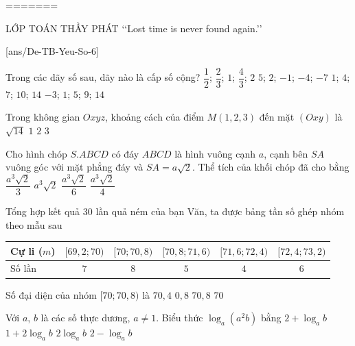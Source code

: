 =======
\begin{name}
	{\tenchude}
	{\tendethi}
	{LỚP TOÁN THẦY PHÁT}
	{\lq\lq Lost time is never found again.\rq\rq}
\end{name}

[ans/De-TB-Yeu-So-6]
\TN
\begin{ex}%
	Trong các dãy số sau, dãy nào là cấp số cộng?
	\choice
	{$\dfrac{1}{2}$; $\dfrac{2}{3}$; $1$; $\dfrac{4}{3}$; $2$}
	{\True $5$; $2$; $-1$; $-4$; $-7$}
	{$1$; $4$; $7$; $10$; $14$}
	{$-3$; $1$; $5$; $9$; $14$}
\end{ex}

\begin{ex}%
	Trong không gian $Oxyz$, khoảng cách của điểm $M(1,2,3)$ đến mặt $(Oxy)$ là
	\choice
	{$\sqrt{14}$}
	{$1$}
	{$2$}
	{\True $3$}
\end{ex}

\begin{ex}%
	Cho hình chóp $S.ABCD$ có đáy $ABCD$ là hình vuông cạnh $a$, cạnh bên $SA$ vuông góc với mặt phẳng đáy và $SA=a\sqrt{2}$. Thể tích của khối chóp đã cho bằng
	\choice
	{\True $\dfrac{a^3\sqrt{2}}{3}$}
	{$a^3\sqrt{2}$}
	{$\dfrac{a^3\sqrt{2}}{6}$}
	{$\dfrac{a^3\sqrt{2}}{4}$}
\end{ex}

\begin{ex}%
	Tổng hợp kết quả $30$ lần quả ném của bạn Văn, ta được bảng tần số ghép nhóm theo mẫu sau
	\begin{longtable}{|l|c|c|c|c|c|}
		\hline
		Cự li ($m$) & $[69{,}2;70)$ & $[70;70{,}8)$ & $[70{,}8;71{,}6)$ & $[71{,}6;72{,}4)$ & $[72{,}4;73{,}2)$ \\
		\hline
		Số lần & $7$ & $8$ & $5$ & $4$ & $6$ \\
		\hline
	\end{longtable}
	Số đại diện của nhóm $[70;70{,}8)$ là
	\choice
	{\True $70{,}4$}
	{$0{,}8$}
	{$70{,}8$}
	{$70$}
\end{ex}

\begin{ex}%
	Với $a$, $b$ là các số thực dương, $a\ne1$. Biểu thức $\log _a\left(a^2b\right)$ bằng
	\choice
	{\True $2+\log _ab$}
	{$1+2\log _ab$}
	{$2\log _ab$}
	{$2-\log _ab$}
\end{ex}

